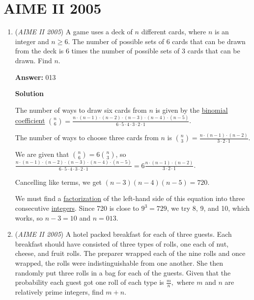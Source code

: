 \section{AIME II 2005}
        \begin{enumerate}
        	\item (\textit{AIME II 2005}) A game uses a deck of $n$ different cards, where $n$ is an integer and $n \geq 6.$ The number of possible sets of 6 cards that can be drawn from the deck is 6 times the number of possible sets of 3 cards that can be drawn. Find $n.$

 \textbf{Answer: }013



\textbf{Solution}

The number of ways to draw six cards from $n$ is given by the \href{https://artofproblemsolving.com/wiki/index.php?title=Binomial\_coefficient}{binomial coefficient} ${n \choose 6} = \frac{n\cdot(n-1)\cdot(n-2)\cdot(n-3)\cdot(n-4)\cdot(n-5)}{6\cdot5\cdot4\cdot3\cdot2\cdot1}$.  

 The number of ways to choose three cards from $n$ is ${n\choose 3} = \frac{n\cdot(n-1)\cdot(n-2)}{3\cdot2\cdot1}$.

 We are given that ${n\choose 6} = 6 {n \choose 3}$, so $\frac{n\cdot(n-1)\cdot(n-2)\cdot(n-3)\cdot(n-4)\cdot(n-5)}{6\cdot5\cdot4\cdot3\cdot2\cdot1} = 6 \frac{n\cdot(n-1)\cdot(n-2)}{3\cdot2\cdot1}$.

 Cancelling like terms, we get $(n - 3)(n - 4)(n - 5) = 720$.

 We must find a \href{https://artofproblemsolving.com/wiki/index.php?title=Factoring}{factorization} of the left-hand side of this equation into three consecutive \href{https://artofproblemsolving.com/wiki/index.php?title=Integer}{integers}. Since 720 is close to $9^3=729$, we try 8, 9, and 10, which works, so $n - 3 = 10$ and $n = \boxed{013}$.

 


	\item (\textit{AIME II 2005}) A hotel packed breakfast for each of three guests. Each breakfast should have consisted of three types of rolls, one each of nut, cheese, and fruit rolls. The preparer wrapped each of the nine rolls and once wrapped, the rolls were indistinguishable from one another. She then randomly put three rolls in a bag for each of the guests. Given that the probability each guest got one roll of each type is $\frac mn,$ where $m$ and $n$ are relatively prime integers, find $m+n.$


\end{enumerate}
